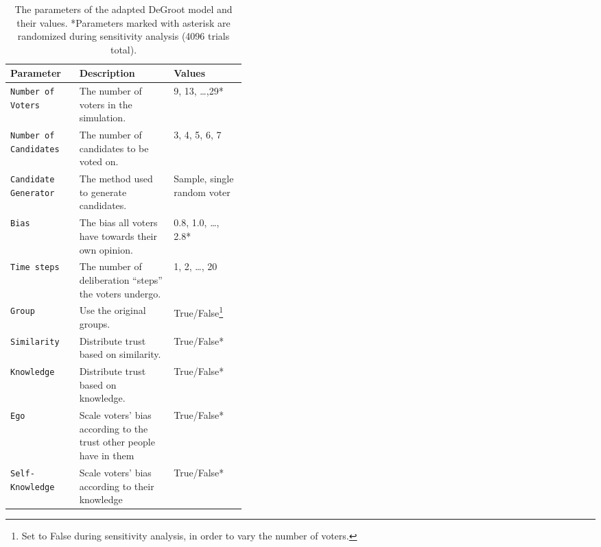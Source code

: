 \renewcommand{\arraystretch}{1.2}
\begin{table}
	\centering
	\begin{tabular}{lp{0.4\linewidth}l}
		\toprule
		Parameter                     & Description                                                         & Values                                                                                                \\
		\midrule
		\texttt{Number of Voters}     & The number of voters in the simulation.                             & 9,  13, \dots,29*                                                                                     \\
		\texttt{Number of Candidates} & The number of candidates to be voted on.                            & 3, 4, 5, 6, 7                                                                                         \\
		\texttt{Candidate Generator}  & The method used to generate candidates.                             & Sample, single random voter                                                                           \\
		\texttt{Bias}                 & The bias all voters have towards their own opinion.                 & 0.8, 1.0, \dots, 2.8*                                                                                 \\
		\texttt{Time steps}           & The number of deliberation ``steps'' the voters undergo.            & 1, 2, \dots, 20                                                                                       \\
		\texttt{Group}                & Use the original groups.                                            & True/False\footnote{Set to False during sensitivity analysis, in order to vary the number of voters.} \\
		\texttt{Similarity}           & Distribute trust based on similarity.                               & True/False*                                                                                           \\
		\texttt{Knowledge}            & Distribute trust based on knowledge.                                & True/False*                                                                                           \\
		\texttt{Ego}                  & Scale voters' bias according to the trust other people have in them & True/False*                                                                                           \\
		\texttt{Self-Knowledge}       & Scale voters' bias according to their knowledge                     & True/False*                                                                                           \\
		\bottomrule
	\end{tabular}
	\label{tab:independent_variables}
	\caption{The parameters of the adapted DeGroot model and their values. *Parameters marked with asterisk are randomized during sensitivity analysis (4096 trials total).}
\end{table}


